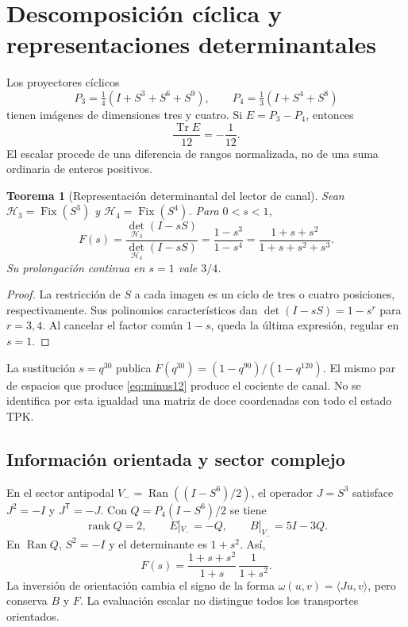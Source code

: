 \documentclass[11pt,a4paper]{article}
\numberwithin{equation}{section}
\newtheorem{theorem}{Teorema}[section]
\theoremstyle{definition}
\newcommand{\Tr}{\operatorname{Tr}}
\begin{document}


\section{Descomposición cíclica y representaciones determinantales}
Los proyectores cíclicos
\[
P_3=\tfrac14(I+S^3+S^6+S^9),\qquad
P_4=\tfrac13(I+S^4+S^8)
\]
tienen imágenes de dimensiones tres y cuatro. Si $E=P_3-P_4$, entonces
\begin{equation}
\frac{\Tr E}{12}=-\frac1{12}.
\label{eq:minus12}
\end{equation}
El escalar procede de una diferencia de rangos normalizada, no de una
suma ordinaria de enteros positivos.

\begin{theorem}[Representación determinantal del lector de canal]
Sean $\mathcal H_3=\operatorname{Fix}(S^3)$ y
$\mathcal H_4=\operatorname{Fix}(S^4)$. Para $0<s<1$,
\begin{equation}
F(s)=\frac{\det_{\mathcal H_3}(I-sS)}{\det_{\mathcal H_4}(I-sS)}
=\frac{1-s^3}{1-s^4}
=\frac{1+s+s^2}{1+s+s^2+s^3}.
\label{eq:det}
\end{equation}
Su prolongación continua en $s=1$ vale $3/4$.
\end{theorem}
\begin{proof}
La restricción de $S$ a cada imagen es un ciclo de tres o cuatro
posiciones, respectivamente. Sus polinomios característicos dan
$\det(I-sS)=1-s^r$ para $r=3,4$. Al cancelar el factor común $1-s$,
queda la última expresión, regular en $s=1$.
\end{proof}

La sustitución $s=q^{30}$ publica
$F(q^{30})=(1-q^{90})/(1-q^{120})$.
El mismo par de espacios que produce \eqref{eq:minus12}
produce el cociente de canal. No se identifica por esta igualdad
una matriz de doce coordenadas con todo el estado TPK.

\subsection{Información orientada y sector complejo}
En el sector antipodal $V_-=\operatorname{Ran}((I-S^6)/2)$,
el operador $J=S^3$ satisface $J^2=-I$ y $J^{\mathsf T}=-J$.
Con $Q=P_4(I-S^6)/2$ se tiene
\[
\operatorname{rank}Q=2,\qquad E|_{V_-}=-Q,\qquad B|_{V_-}=5I-3Q.
\]
En $\operatorname{Ran}Q$, $S^2=-I$ y el determinante es $1+s^2$.
Así,
\[
F(s)=\frac{1+s+s^2}{1+s}\,\frac1{1+s^2}.
\]
La inversión de orientación cambia el signo de la forma
$\omega(u,v)=\langle Ju,v\rangle$, pero conserva $B$ y $F$.
La evaluación escalar no distingue todos los transportes orientados.
\end{document}
